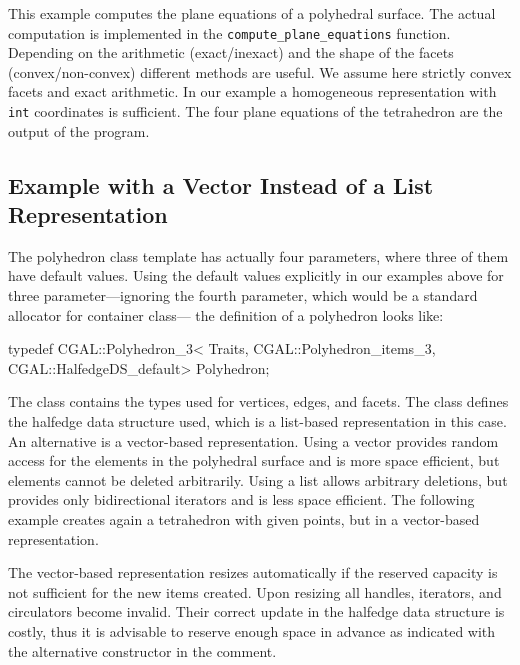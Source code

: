 This example computes the plane equations of a polyhedral surface.
The actual computation is implemented in the
\texttt{compute\_plane\_equations} function.  Depending on the arithmetic
(exact/inexact) and the shape of the facets (convex/non-convex)
different methods are useful. We assume here strictly convex facets
and exact arithmetic. In our example a homogeneous representation with
\texttt{int} coordinates is sufficient. The four plane equations of the
tetrahedron are the output of the program.


\subsection{Example with a Vector Instead of a List Representation\label{sectionPolyVector}}

The polyhedron class template has actually four parameters, where
three of them have default values. Using the default values explicitly
in our examples above for three parameter---ignoring the fourth
parameter, which would be a standard allocator for container class---
the definition of a polyhedron looks like:

\begin{ccExampleCode}
typedef CGAL::Polyhedron_3< Traits, 
                            CGAL::Polyhedron_items_3, 
                            CGAL::HalfedgeDS_default>      Polyhedron;
\end{ccExampleCode}

The  class contains the types used for
vertices, edges, and facets. The  class
defines the halfedge data structure used, which is a list-based
representation in this case. An alternative is a vector-based
representation. Using a vector provides random
access for the elements in the polyhedral surface and is more space
efficient, but elements cannot be deleted arbitrarily. Using a list
allows arbitrary deletions, but provides only bidirectional iterators
and is less space efficient. The following example creates again a 
tetrahedron with given points, but in a vector-based representation.

The vector-based representation resizes automatically if the reserved
capacity is not sufficient for the new items created. Upon resizing
all handles, iterators, and circulators become invalid. Their correct
update in the halfedge data structure is costly, thus it is advisable
to reserve enough space in advance as indicated with the alternative
constructor in the comment. 

